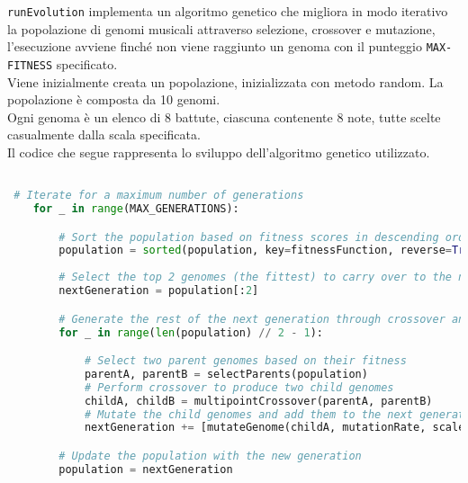 \documentclass[a4paper,12pt]{report}
\begin{document}
\texttt{runEvolution} implementa un algoritmo genetico che migliora in modo iterativo la popolazione di genomi musicali attraverso selezione, crossover e mutazione, l'esecuzione avviene finché non viene raggiunto un genoma con il punteggio \texttt{MAX-FITNESS} specificato. \\
Viene inizialmente creata un popolazione, inizializzata con metodo random. La popolazione è composta da 10 genomi. \\
Ogni genoma è un elenco di 8 battute, ciascuna contenente 8 note, tutte scelte casualmente dalla scala specificata. \\
Il codice che segue rappresenta lo sviluppo dell'algoritmo genetico utilizzato.

\begin{lstlisting}[language=Python]

 # Iterate for a maximum number of generations
    for _ in range(MAX_GENERATIONS):

        # Sort the population based on fitness scores in descending order
        population = sorted(population, key=fitnessFunction, reverse=True)
        
        # Select the top 2 genomes (the fittest) to carry over to the next generation
        nextGeneration = population[:2]

        # Generate the rest of the next generation through crossover and mutation
        for _ in range(len(population) // 2 - 1):

            # Select two parent genomes based on their fitness
            parentA, parentB = selectParents(population)
            # Perform crossover to produce two child genomes
            childA, childB = multipointCrossover(parentA, parentB)
            # Mutate the child genomes and add them to the next generation
            nextGeneration += [mutateGenome(childA, mutationRate, scale), mutateGenome(childB, mutationRate, scale)]

        # Update the population with the new generation
        population = nextGeneration
        
\end{lstlisting}
\end{document}
